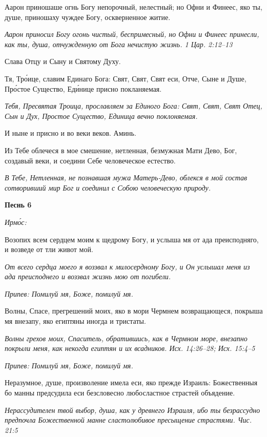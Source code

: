 Аарон приношаше огнь Богу непорочный, нелестный; но Офни и Финеес, яко ты, душе, приношаху чуждее Богу, оскверненное житие.


\itshape Аарон приносил Богу огонь чистый, беспримесный, но Офни и Финеес принесли, как ты, душа, отчужденную от Бога нечистую жизнь. 1 Цар. 2:12–13\normalfont{}


Слава Отцу и Сыну и Святому Духу.


Тя, Тро́ице, славим Единаго Бога: Свят, Свят, Свят еси, Отче, Сыне и Душе, Про́стое Существо, Еди́нице присно покланяемая.


\itshape Тебя, Пресвятая Троица, прославляем за Единого Бога: Свят, Свят, Свят Отец, Сын и Дух, Простое Существо, Единица вечно поклоняемая.\normalfont{}


И ныне и присно и во веки веков. Аминь.


Из Тебе облечеся в мое смешение, нетленная, безмужная Мати Дево, Бог, создавый веки, и соедини Себе человеческое естество.


\itshape В Тебе, Нетленная, не познавшая мужа Матерь-Дево, облекся в мой состав сотворивший мир Бог и соединил с Собою человеческую природу.\normalfont{}





\bfseries Песнь 6\normalfont{}


\itshape Ирмо́с:\normalfont{}


Возопих всем сердцем моим к щедрому Богу, и услыша мя от ада преисподняго, и возведе от тли живот мой.


\itshape От всего сердца моего я воззвал к милосердному Богу, и Он услышал меня из ада преисподнего и воззвал жизнь мою от погибели.\normalfont{}


\itshape Припев:\normalfont{} Помилуй мя, Боже, помилуй мя.


Волны, Спасе, прегрешений моих, яко в мори Чермнем возвращающеся, покрыша мя внезапу, яко египтяны иногда и тристаты.


\itshape Волны грехов моих, Спаситель, обратившись, как в Чермном море, внезапно покрыли меня, как некогда египтян и их всадников. Исх. 14:26–28; Исх. 15:4–5\normalfont{}


\itshape Припев:\normalfont{} Помилуй мя, Боже, помилуй мя.


Неразумное, душе, произволение имела еси, яко прежде Израиль: Божественныя бо манны предсудила еси безсловесно любосластное страстей объядение.


\itshape Нерассудителен твой выбор, душа, как у древнего Израиля, ибо ты безрассудно предпочла Божественной манне сластолюбивое пресыщение страстями. Чис. 21:5\normalfont{}


